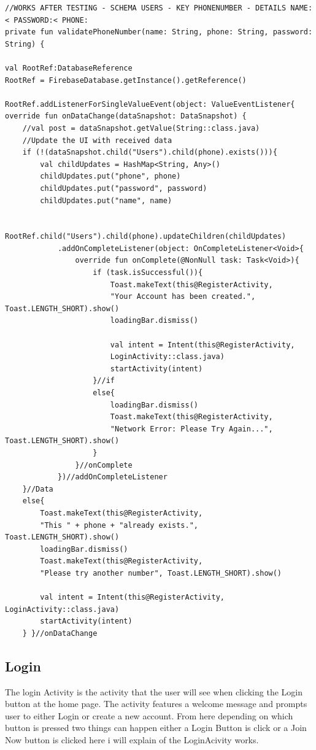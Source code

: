 \begin{verbatim}
//WORKS AFTER TESTING - SCHEMA USERS - KEY PHONENUMBER - DETAILS NAME:< PASSWORD:< PHONE:
private fun validatePhoneNumber(name: String, phone: String, password: String) {

val RootRef:DatabaseReference
RootRef = FirebaseDatabase.getInstance().getReference()

RootRef.addListenerForSingleValueEvent(object: ValueEventListener{
override fun onDataChange(dataSnapshot: DataSnapshot) {
    //val post = dataSnapshot.getValue(String::class.java)
    //Update the UI with received data
    if (!(dataSnapshot.child("Users").child(phone).exists())){
        val childUpdates = HashMap<String, Any>()
        childUpdates.put("phone", phone)
        childUpdates.put("password", password)
        childUpdates.put("name", name)

        RootRef.child("Users").child(phone).updateChildren(childUpdates)
            .addOnCompleteListener(object: OnCompleteListener<Void>{
                override fun onComplete(@NonNull task: Task<Void>){
                    if (task.isSuccessful()){
                        Toast.makeText(this@RegisterActivity,
                        "Your Account has been created.", Toast.LENGTH_SHORT).show()
                        loadingBar.dismiss()

                        val intent = Intent(this@RegisterActivity,
                        LoginActivity::class.java)
                        startActivity(intent)
                    }//if
                    else{
                        loadingBar.dismiss()
                        Toast.makeText(this@RegisterActivity,
                        "Network Error: Please Try Again...", Toast.LENGTH_SHORT).show()
                    }
                }//onComplete
            })//addOnCompleteListener
    }//Data
    else{
        Toast.makeText(this@RegisterActivity,
        "This " + phone + "already exists.", Toast.LENGTH_SHORT).show()
        loadingBar.dismiss()
        Toast.makeText(this@RegisterActivity,
        "Please try another number", Toast.LENGTH_SHORT).show()

        val intent = Intent(this@RegisterActivity, LoginActivity::class.java)
        startActivity(intent)
    } }//onDataChange
\end{verbatim}
\subsection{Login}
The login Activity is the activity that the user will see when clicking the Login button at the home page. The activity features a welcome message and prompts user to either Login or create a new account. From here depending on which button is pressed two things can happen either a Login Button is click or a Join Now button is clicked here i will explain of the LoginAcivity works.\newline

